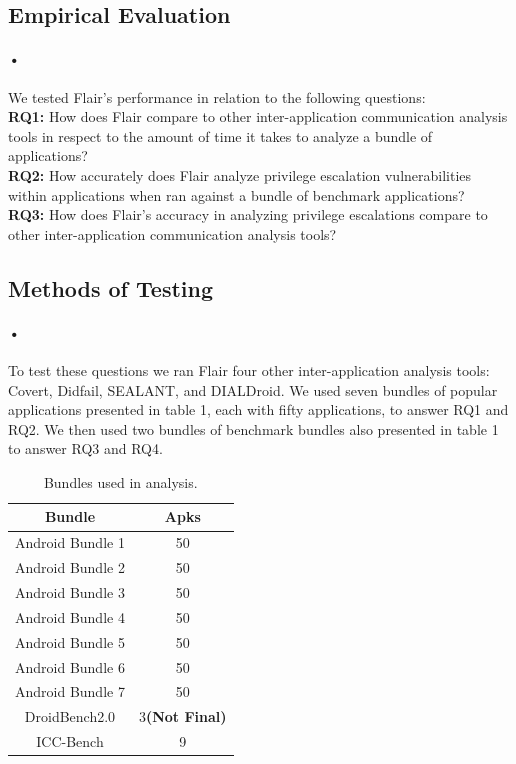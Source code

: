 \documentclass[twocolumn]{article}
\begin{document}
\begin{center}
\section[2]{Empirical Evaluation}
\end{center}

\paragraph{•}
	We tested Flair's performance in relation to the following questions:\\
	\textbf{RQ1:} How does Flair compare to other inter-application communication analysis tools in respect to the amount of time it takes to analyze a bundle of applications?\\
	\textbf{RQ2:} How accurately does Flair analyze privilege escalation vulnerabilities within applications when ran against a bundle of benchmark applications?\\
	\textbf{RQ3:} How does Flair's accuracy in analyzing privilege escalations compare to other inter-application communication analysis tools?\\

\subsection{Methods of Testing} \label{methods}
\paragraph{•}
	To test these questions we ran Flair four other inter-application analysis tools: Covert, Didfail, SEALANT, and DIALDroid. We used seven bundles of popular applications presented in table 1, each with fifty applications, to answer RQ1 and RQ2. We then used two bundles of benchmark bundles also presented in table 1 to answer RQ3 and RQ4. 

\begin{table}[h]
\begin{center}
\begin{tabular}{ |c c| }
	\hline
	Bundle & Apks\\
	\hline
	Android Bundle 1 & 50\\
	Android Bundle 2 & 50\\
	Android Bundle 3 & 50\\
	Android Bundle 4 & 50\\
	Android Bundle 5 & 50\\
	Android Bundle 6 & 50\\
	Android Bundle 7 & 50\\
	DroidBench2.0 & 3\textbf{(Not Final)}\\
	ICC-Bench & 9\\
	\hline
\end{tabular}
\end{center}
\caption{Bundles used in analysis.}
\label{table:1}
\end{table}
\end{document}

